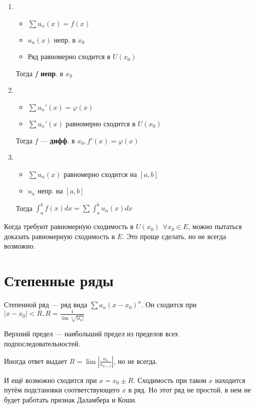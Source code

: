 \begin{enumerate}
    \item \begin{itemize}
              \item \(\sum u_n(x) = f(x)\)
              \item \(u_n(x)\) непр. в \(x_0\)
              \item Ряд равномерно сходится в \(U(x_0)\)
          \end{itemize}
          Тогда \(f\) \textbf{непр}. в \(x_0\)
    \item \begin{itemize}
              \item \(\sum u_n'(x) = \varphi(x)\)
              \item \(\sum u_n'(x)\) равномерно сходится в \(U(x_0)\)
          \end{itemize}
          Тогда \(f\) --- \textbf{дифф}. в \(x_0, f'(x) = \varphi(x)\)
    \item \begin{itemize}
              \item \(\sum u_n(x) \) равномерно сходится на \([a, b]\)
              \item \(u_n\) непр. на \([a, b]\)
          \end{itemize}
          Тогда \(\int_a^b f(x)dx = \sum \int_a^b u_n(x) dx\)
\end{enumerate}

Когда требуют равномерную сходимость в \(U(x_0) \ \ \forall x_0\in E\), можно пытаться доказать равномерную сходимость в \(E\). Это проще сделать, но не всегда возможно.

\section{Степенные ряды}

Степенной ряд --- ряд вида \(\sum a_n(x - x_0)^n\). Он сходится при \(\left|x - x_0\right|< R, R = \frac{1}{\overline \lim\sqrt[n]{|a_n|}}\)

Верхний предел --- наибольший предел из пределов всех подпоследовательностей.

Иногда ответ выдает \(R = \lim \left|\frac{a_n}{a_{n + 1}}\right|\), но не всегда.

И ещё возможно сходится при \(x = x_0 \pm R\). Сходимость при таком \(x\) находится путём подстановки соответствующего \(x\) в ряд. Но этот ряд не простой, в нем не будет работать признак Даламбера и Коши.

